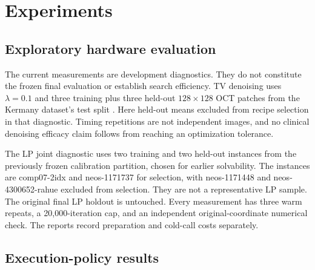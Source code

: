\section{Experiments}
\label{sec:experiments}

\subsection{Exploratory hardware evaluation}
\label{sec:setup}

The current measurements are development diagnostics. They do not constitute
the frozen final evaluation or establish search efficiency. TV denoising uses
$\lambda=0.1$ and three training plus three held-out $128\times128$ OCT
patches from the Kermany dataset's test split \citep{Kermany2018Identifying}.
Here held-out means excluded from recipe selection in that diagnostic.
Timing repetitions are not independent images, and no clinical denoising
efficacy claim follows from reaching an optimization tolerance.

The LP joint diagnostic uses two training and two held-out instances from the
previously frozen calibration partition, chosen for earlier solvability. The
instances are comp07-2idx and neos-1171737 for selection, with neos-1171448 and
neos-4300652-rahue excluded from selection. They are not a representative LP
sample. The original final LP holdout is untouched. Every measurement has three
warm repeats, a 20{,}000-iteration cap, and an independent original-coordinate
numerical check. The reports record preparation and cold-call costs separately.

\subsection{Execution-policy results}
\label{sec:results}

